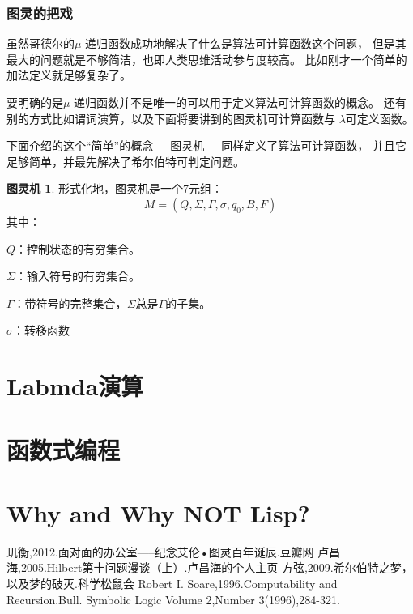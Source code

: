 \documentclass[12pt,a4paper]{ctexrep}
\theoremstyle{definition}
\newtheorem{tm}{图灵机}
\begin{document}
\subsection{图灵的把戏}

虽然哥德尔的$\mu$-递归函数成功地解决了什么是算法可计算函数这个问题，
但是其最大的问题就是不够简洁，也即人类思维活动参与度较高。
比如刚才一个简单的加法定义就足够复杂了。

要明确的是$\mu$-递归函数并不是唯一的可以用于定义算法可计算函数的概念。
还有别的方式比如谓词演算，以及下面将要讲到的图灵机可计算函数与
$\lambda$可定义函数。

下面介绍的这个“简单”的概念-----图灵机-----同样定义了算法可计算函数，
并且它足够简单，并最先解决了希尔伯特可判定问题。

\begin{tm}
形式化地，图灵机是一个7元组：
\begin{equation}
M=(Q,\Sigma,\Gamma,\sigma,q_0,B,F)
\end{equation}
其中：

$Q$：控制状态的有穷集合。

$\Sigma$：输入符号的有穷集合。

$\Gamma$：带符号的完整集合，$\Sigma$总是$\Gamma$的子集。

$\sigma$：转移函数

\end{tm}

\chapter{Labmda演算}
\chapter{函数式编程}

\chapter{Why and Why NOT Lisp?}

\begin{thebibliography}{99}
 玑衡,2012.面对面的办公室-----纪念艾伦•图灵百年诞辰.豆瓣网
 卢昌海,2005.Hilbert第十问题漫谈（上）.卢昌海的个人主页
 方弦,2009.希尔伯特之梦，以及梦的破灭.科学松鼠会
 Robert I. Soare,1996.Computability and Recursion.Bull. Symbolic Logic Volume 2,Number 3(1996),284-321.
\end{thebibliography}
\end{document}
